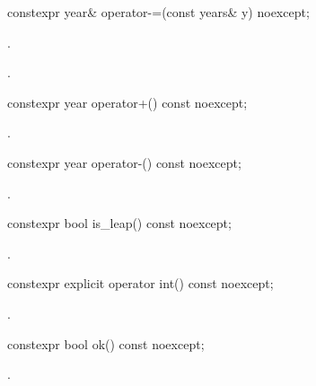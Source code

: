 %
\begin{itemdecl}
constexpr year& operator-=(const years& y) noexcept;
\end{itemdecl}

\begin{itemdescr}
\pnum
\effects
{}.

\pnum
\returns
{}.
\end{itemdescr}

%
\begin{itemdecl}
constexpr year operator+() const noexcept;
\end{itemdecl}

\begin{itemdescr}
\pnum
\returns
{}.
\end{itemdescr}

%
\begin{itemdecl}
constexpr year operator-() const noexcept;
\end{itemdecl}

\begin{itemdescr}
\pnum
\returns
{}.
\end{itemdescr}

%
\begin{itemdecl}
constexpr bool is_leap() const noexcept;
\end{itemdecl}

\begin{itemdescr}
\pnum
\returns
{}.
\end{itemdescr}

%
\begin{itemdecl}
constexpr explicit operator int() const noexcept;
\end{itemdecl}

\begin{itemdescr}
\pnum
\returns
{}.
\end{itemdescr}

%
\begin{itemdecl}
constexpr bool ok() const noexcept;
\end{itemdecl}

\begin{itemdescr}
\pnum
\returns
{}.
\end{itemdescr}

